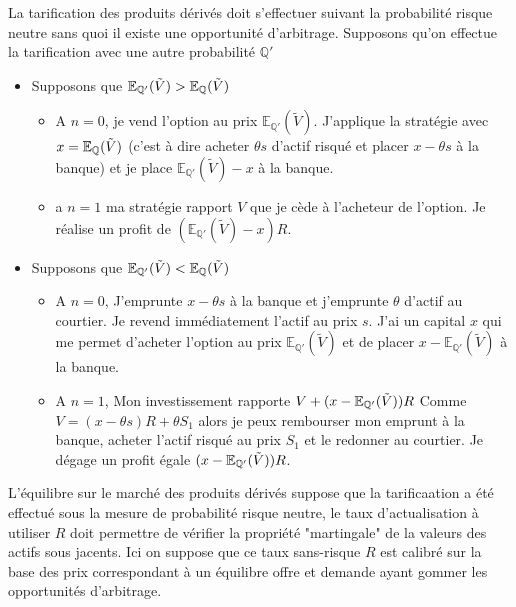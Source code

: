 \begin{remark}
La tarification des produits dérivés doit s'effectuer suivant la probabilité risque neutre sans quoi il existe une opportunité d'arbitrage. Supposons qu'on effectue la tarification avec une autre probabilité $\mathbb{Q}'$
\begin{itemize}
    \item Supposons que $\mathbb{E}_{\mathbb{Q}'}(\tilde{V}) > \mathbb{E}_{\mathbb{Q}}(\tilde{V})$
    \begin{itemize}
        \item A $n=0$, je vend l'option au prix $\mathbb{E}_{\mathbb{Q}'}(\tilde{V})$. J'applique la stratégie avec $x = \mathbb{E}_{\mathbb{Q}}(\tilde{V})$ (c'est à dire acheter $\theta s$ d'actif risqué et placer $x-\theta s$ à la banque) et je place $\mathbb{E}_{\mathbb{Q}'}(\tilde{V}) - x$ à la banque.
        \item a $n= 1$ ma stratégie rapport $V$ que je cède à l'acheteur de l'option. Je réalise un profit de $(\mathbb{E}_{\mathbb{Q}'}(\tilde{V}) - x)R$.
    \end{itemize}
    \item Supposons que $\mathbb{E}_{\mathbb{Q}'}(\tilde{V}) < \mathbb{E}_{\mathbb{Q}}(\tilde{V})$
    \begin{itemize}
        \item A $n=0$, J'emprunte $x-\theta s$ à la banque et j'emprunte $\theta$ d'actif au courtier. Je revend immédiatement l'actif au prix $s$. J'ai un capital $x$ qui me permet d'acheter l'option au prix $\mathbb{E}_{\mathbb{Q}'}(\tilde{V})$ et de placer $x-\mathbb{E}_{\mathbb{Q}'}(\tilde{V})$ à la banque.
        \item A $n = 1$, Mon investissement rapporte $V + (x-\mathbb{E}_{\mathbb{Q}'}(\tilde V))R$ Comme $V = (x-\theta s)R + \theta S_1$ alors je peux rembourser mon emprunt à la banque, acheter l'actif risqué au prix $S_1$ et le redonner au courtier. Je dégage un profit égale $(x-\mathbb{E}_{\mathbb{Q}'}(\tilde V))R$.
    \end{itemize}
\end{itemize}
L'équilibre sur le marché des produits dérivés suppose que la tarificaation a été effectué sous la mesure de probabilité risque neutre, le taux d'actualisation à utiliser $R$ doit permettre de vérifier la propriété "martingale" de la valeurs des actifs sous jacents. Ici on suppose que ce taux sans-risque $R$ est calibré sur la base des prix correspondant à un équilibre offre et demande ayant gommer les opportunités d'arbitrage.
\end{remark}

